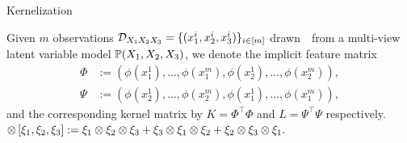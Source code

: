 \documentclass[final,t]{beamer}
\begin{document}
\begin{frame}{}
\begin{columns}[t]
\begin{column}{.3\linewidth}
      \begin{block}{Kernelization}
      
      Given $m$ observations $\mathcal{D}_{X_1 X_2 X_3}=\{(x_1^i,x_2^i,x_3^i)\}_{i \in [m]}$ drawn~\iid~from a multi-view latent variable model $\mathbb{P}(X_1,X_2,X_3)$,  we denote the implicit feature matrix
      \vspace{-0.5in}
      \begin{align*}
        \Phi &:= (\phi(x_1^1), \ldots, \phi(x_1^m), \phi(x_2^1),  \ldots, \phi(x_2^m)),  \\
        \Psi &:= (\phi(x_2^1), \ldots, \phi(x_2^m), \phi(x_1^1),  \ldots, \phi(x_1^m)),
      \end{align*}
      and the corresponding kernel matrix by $K = \Phi^\top \Phi$ and $L = \Psi^\top \Psi$ respectively. 
      $
        \otimes\left[\xi_1,\xi_2,\xi_3\right] := \xi_1\otimes\xi_2\otimes\xi_3 + \xi_3\otimes\xi_1\otimes\xi_2 + \xi_2\otimes\xi_3\otimes\xi_1.
      $

\end{block}
\end{column}
\end{columns}
\end{frame}
\end{document}
